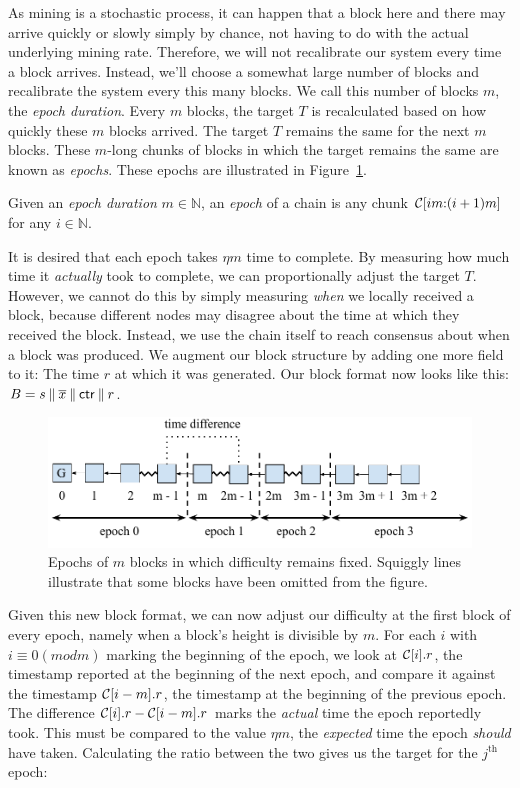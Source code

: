 As mining is a stochastic process, it can happen that a block
here and there may arrive quickly or slowly simply by chance,
not having to do with the actual underlying mining rate. Therefore,
we will not recalibrate our system every time a block arrives.
Instead, we'll choose a somewhat large number of blocks
and recalibrate the system every this many blocks. We call this
number of blocks $m$, the \emph{epoch duration}. Every $m$
blocks, the target $T$ is recalculated based on how quickly
these $m$ blocks arrived. The target $T$ remains the same
for the next $m$ blocks. These $m$-long chunks of blocks
in which the target remains the same are known as \emph{epochs}.
These epochs are illustrated in Figure~\ref{fig.pow-epochs}.

\begin{definition}[Epoch]
  Given an \emph{epoch duration} $m \in \mathbb{N}$,
  an \emph{epoch} of a chain is any chunk $\mathcal{C}[im{:}(i + 1)m]$
  for any $i \in \mathbb{N}$.
\end{definition}

It is desired that each epoch takes $\eta m$ time to complete.
By measuring how much time it \emph{actually} took to complete,
we can proportionally adjust the target $T$. However, we cannot
do this by simply measuring \emph{when} we locally received a block,
because different nodes may disagree about the time at which
they received the block. Instead, we use the chain itself to
reach consensus about when a block was produced. We augment
our block structure by adding one more field to it: The time $r$
at which it was generated. Our block format now looks like
this: $B = s \mathbin{\|} \overline{x} \mathbin{\|} \mathsf{ctr} \mathbin{\|} r$.

\begin{figure}[h]
  \centering
  \includegraphics[width=0.8 \columnwidth,keepaspectratio]{figures/pow-epochs.pdf}
  \caption{Epochs of $m$ blocks in which difficulty remains fixed. Squiggly lines
           illustrate that some blocks have been omitted from the figure.}
  \label{fig.pow-epochs}
\end{figure}

Given this new block format, we can now adjust our difficulty at
the first block of every epoch, namely when a block's height is
divisible by $m$. For each $i$ with $i \equiv 0 (mod m)$ marking
the beginning of the epoch, we look at $\mathcal{C}[i].r$, the timestamp
reported at the beginning of the next epoch, and compare it against
the timestamp $\mathcal{C}[i - m].r$, the timestamp at the beginning
of the previous epoch. The difference $\mathcal{C}[i].r - \mathcal{C}[i - m].r$
marks the \emph{actual} time the epoch reportedly took. This must
be compared to the value $\eta m$, the \emph{expected} time
the epoch \emph{should}
have taken. Calculating the ratio between the two gives us the
target for the $j^\text{th}$ epoch:

